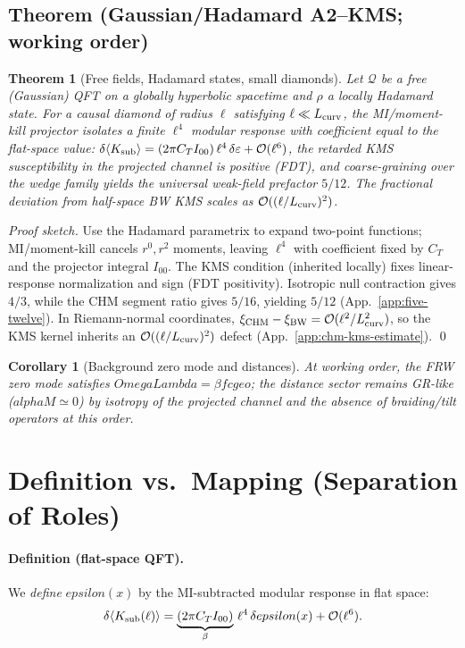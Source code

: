 \documentclass[aps,prd,onecolumn,superscriptaddress,nofootinbib]{revtex4-2}
\def\OmL{OmegaLambda}%
\def\cgeo{cgeo}%
\def\alphaM{alphaM}%
\def\eps{epsilon}%
\def\alpha{alpha}%
\def\alpha_M{alphaM}%
\def\Omega_\Lambda{OmegaLambda}%
\providecommand{\OmL}{\Omega_\Lambda}
\providecommand{\cgeo}{c_{\rm geo}}
\providecommand{\alphaM}{\alpha_M}
\providecommand{\eps}{\varepsilon}
\newtheorem{theorem}{Theorem}
\newtheorem{corollary}{Corollary}
\begin{document}
\subsection*{Theorem (Gaussian/Hadamard A2–KMS; working order)}
\label{sec:theorem}
\begin{theorem}[Free fields, Hadamard states, small diamonds]
Let $\mathcal Q$ be a free (Gaussian) QFT on a globally hyperbolic spacetime and $\rho$ a locally Hadamard state. For a causal diamond of radius $\ell$ satisfying $\ell\ll L_{\rm curv}$, the MI/moment-kill projector isolates a finite $\ell^4$ modular response with coefficient equal to the flat-space value:
$\delta\langle K_{\rm sub}\rangle=(2\pi C_T I_{00})\,\ell^4\,\delta\varepsilon+\mathcal O(\ell^6)$,
the retarded KMS susceptibility in the projected channel is positive (FDT), and coarse-graining over the wedge family yields the universal weak-field prefactor $5/12$. The fractional deviation from half-space BW KMS scales as $\mathcal O((\ell/L_{\rm curv})^2)$.
\end{theorem}
\noindent\emph{Proof sketch.} Use the Hadamard parametrix to expand two-point functions; MI/moment-kill cancels $r^0,r^2$ moments, leaving $\ell^4$ with coefficient fixed by $C_T$ and the projector integral $I_{00}$. The KMS condition (inherited locally) fixes linear-response normalization and sign (FDT positivity). Isotropic null contraction gives $4/3$, while the CHM segment ratio gives $5/16$, yielding $5/12$ (App.~\ref{app:five-twelve}). In Riemann-normal coordinates, $\xi_{\rm CHM}-\xi_{\rm BW}=\mathcal O(\ell^2/L_{\rm curv}^2)$, so the KMS kernel inherits an $\mathcal O((\ell/L_{\rm curv})^2)$ defect (App.~\ref{app:chm-kms-estimate}). \qed

\begin{corollary}[Background zero mode and distances]
\label{cor:zeroMode}
At working order, the FRW zero mode satisfies $\OmL=\beta f \cgeo$; the distance sector remains GR-like ($\alphaM\simeq 0$) by isotropy of the projected channel and the absence of braiding/tilt operators at this order.
\end{corollary}

\section{Definition vs.\ Mapping (Separation of Roles)}
\label{sec:def-vs-map}
\paragraph{Definition (flat-space QFT).} We \emph{define} $\eps(x)$ by the MI-subtracted modular response in flat space:
\begin{equation}
\label{eq:eps-def}
\delta\langle K_{\rm sub}(\ell)\rangle = \underbrace{(2\pi C_T I_{00})}_{\beta}\,\ell^4\,\delta\eps(x) + \mathcal O(\ell^6).
\end{equation}
\end{document}
